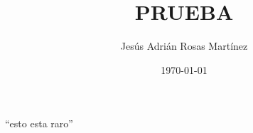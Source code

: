 \documentclass[12pt]{article}
\title{PRUEBA}
\author{Jes\'us Adri\'an Rosas Mart\'inez}
\date{\small{\today}}
\begin{document}
\maketitle %
``esto esta raro''
\end{document}
